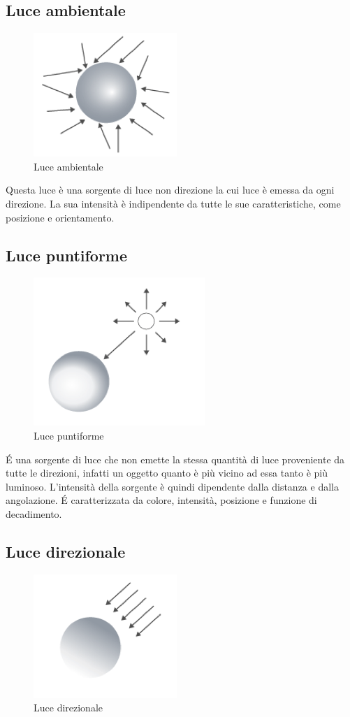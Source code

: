 \documentclass[9pt,a4paper,twoside]{tau}
\begin{document}
\subsection{Luce ambientale}
\begin{figure}[H]
        \centering
        \includegraphics[width=0.3\columnwidth]{Figures/01.png}
        \caption{Luce ambientale}
        \label{fig:figure}
\end{figure}
Questa luce è una sorgente di luce non direzione la cui luce è emessa da ogni direzione. La sua intensità è indipendente da tutte le sue caratteristiche, come posizione e orientamento.
\subsection{Luce puntiforme}
\begin{figure}[H]
        \centering
        \includegraphics[width=0.3\columnwidth]{Figures/02.png}
        \caption{Luce puntiforme}
        \label{fig:figure}
\end{figure}
\'E una sorgente di luce che non emette la stessa quantità di luce proveniente da tutte le direzioni, infatti un oggetto quanto è più vicino ad essa tanto è più luminoso. L'intensità della sorgente è quindi dipendente dalla distanza e dalla angolazione. \'E caratterizzata da colore, intensità, posizione e funzione di decadimento.
\subsection{Luce direzionale}
\begin{figure}[H]
        \centering
        \includegraphics[width=0.3\columnwidth]{Figures/03.png}
        \caption{Luce direzionale}
        \label{fig:figure}
\end{figure}
\end{document}
